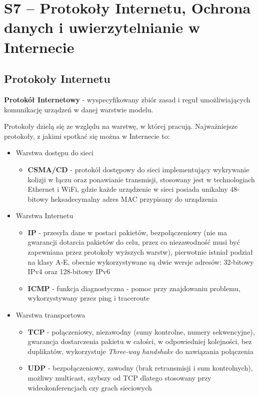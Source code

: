 \section{S7 -- Protokoły Internetu, Ochrona danych i uwierzytelnianie w Internecie}

\subsection{Protokoły Internetu}

\textbf{Protokół Internetowy} - wyspecyfikowany zbiór zasad i reguł umożliwiających komunikację urządzeń w danej warstwie modelu.

Protokoły dzielą się ze względu na warstwę, w której pracują. Najważniejsze protokoły, z jakimi spotkać się można w Internecie to:

\begin{itemize}
	\item Warstwa dostępu do sieci
	\begin{itemize}
		\item \textbf{CSMA/CD} - protokół dostępowy do sieci implementujący wykrywanie kolizji w łączu oraz ponawianie transmisji, stosowany jest w technologiach Ethernet i WiFi, gdzie każde urządzenie w sieci posiada unikalny 48-bitowy heksadecymalny adres MAC przypisany do urządzenia
	\end{itemize}
    
    \item Warstwa Internetu
    \begin{itemize}
		\item \textbf{IP} - przesyła dane w postaci pakietów, bezpołączeniowy (nie ma gwarancji dotarcia pakietów do celu, przez co niezawodność musi być zapewniana przez protokoły wyższych warstw), pierwotnie istniał podział na klasy A-E, obecnie wykorzystywane są dwie wersje adresów: 32-bitowy IPv4 oraz 128-bitowy IPv6
        \item \textbf{ICMP} - funkcja diagnostyczna - pomoc przy znajdowaniu problemu, wykorzystywany przez ping i traceroute
	\end{itemize}
    
    \item Warstwa transportowa
    \begin{itemize}
		\item \textbf{TCP} - połączeniowy, niezawodny (sumy kontrolne, numery sekwencyjne), gwarancja dostarczenia pakietu w całości, w odpowiedniej kolejności, bez duplikatów, wykorzystuje \textit{Three-way handshake} do nawiązania połączenia
		\item \textbf{UDP} - bezpołączeniowy, zawodny (brak retransmisji i sum kontrolnych), możliwy multicast, szybszy od TCP dlatego stosowany przy wideokonferencjach czy grach sieciowych
	\end{itemize}
    

\end{itemize}
